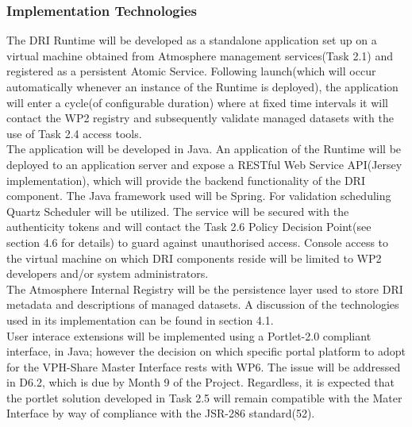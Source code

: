 \documentclass[a4paper,12pt,titlepage]{article}
\begin{document}
\subsubsection{Implementation Technologies}
The DRI Runtime will be developed as a standalone application set up on a virtual machine obtained from Atmosphere management services(Task 2.1) and registered as a persistent Atomic Service. Following launch(which will occur automatically whenever an instance of the Runtime is deployed), the application will enter a cycle(of configurable duration) where at fixed time intervals it will contact the WP2 registry and subsequently validate managed datasets with the use of Task 2.4 access tools.\\

\noindent
The application will be developed in Java. An application of the Runtime will be deployed to an application server and expose a RESTful Web Service API(Jersey implementation), which will provide the backend functionality of the DRI component. The Java framework used will be Spring. For validation scheduling Quartz Scheduler will be utilized. The service will be secured with the authenticity tokens and will contact the Task 2.6 Policy Decision Point(see section 4.6 for details) to guard against unauthorised access. Console access to the virtual machine on which DRI components reside will be limited to WP2 developers and/or system administrators.\\

\noindent
The Atmosphere Internal Registry will be the persistence layer used to store DRI metadata and descriptions of managed datasets. A discussion of the technologies used in its implementation can be found in section 4.1.\\

\noindent
User interace extensions will be implemented using a Portlet-2.0 compliant interface, in Java; however the decision on which specific portal platform to adopt for the VPH-Share Master Interface rests with WP6. The issue will be addressed in D6.2, which is due by Month 9 of the Project. Regardless, it is expected that the portlet solution developed in Task 2.5 will remain compatible with the Mater Interface by way of compliance with the JSR-286 standard(52).
\end{document}
